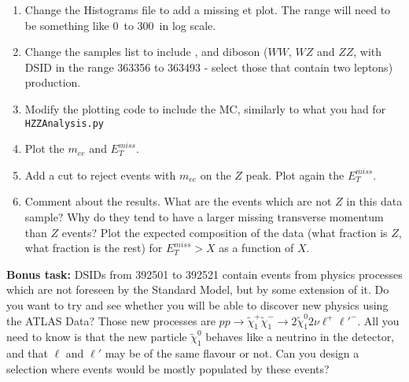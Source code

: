 \begin{enumerate} 
\item Change the Histograms file to add a missing et plot. The range will need to be something like 0\ \GeV to 300\ \GeV in log scale. 
\item Change the samples list to include \ttbar, and diboson ($WW$, $WZ$ and $ZZ$, with DSID in the range 363356 to 363493 - select those that contain two leptons) production.   
\item Modify the plotting code to include the MC, similarly to what you had for \verb|HZZAnalysis.py|
\item Plot the $m_{ee}$ and $E_{T}^{miss}$.
\item Add a cut to reject events with $m_{ee}$ on the $Z$ peak. Plot again the $E_{T}^{miss}$. 
\item Comment about the results. What are the events which are not $Z$ in this data sample? Why do they tend to have a larger missing transverse momentum than $Z$ events?  Plot the expected composition of the data (what fraction is $Z$, what fraction is the rest) for $ E_{T}^{miss} > X$ as a function of $X$.
\end{enumerate}


\textbf{Bonus task:} DSIDs from 392501 to 392521 contain events from physics processes which are not foreseen by the Standard Model, but by some extension of it. Do you want to try and see whether you will be able to discover new physics using the ATLAS Data? Those new processes are $pp\rightarrow \tilde{\chi}^+_1  \tilde{\chi}^-_1 \rightarrow 2\tilde{\chi}^0_1 2\nu \ell^+\ell'^-$. All you need to know is that the new particle $\tilde{\chi}^0_1$ behaves like a neutrino in the detector, and that $\ell$ and $\ell'$ may be of the same flavour or not. Can you design a selection where events would be mostly populated by these events? 



